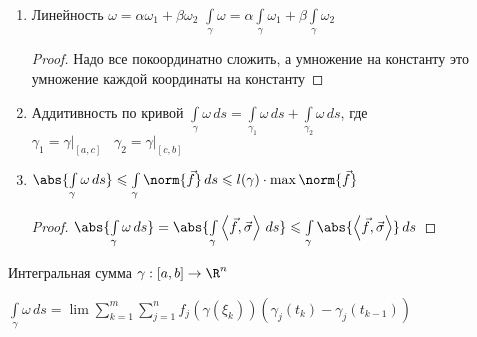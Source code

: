 \begin{properties}
\begin{enumerate}[1.]
\begin{proof}
			$\vec{\sigma}(\gamma(t)) = \frac{\gamma'(t)}{\norm{\gamma'(t)}}$ (нам нужна касательная к кривой $\Rightarrow$ это производная, а затем надо его отнормировать)
		\end{proof}
		
		\item 
		Линейность $\omega = \alpha \omega_1 + \beta \omega_2$
		$\int\limits_\gamma \omega = \alpha\int\limits_\gamma \omega_1 + \beta\int\limits_\gamma \omega_2$
		\begin{proof}
			Надо все покоординатно сложить, а умножение на константу это умножение каждой координаты на константу
		\end{proof}
		
		\item
		Аддитивность по кривой $ \int\limits_{\gamma} \omega\,ds = \int\limits_{\gamma_1} \omega\,ds + \int\limits_{\gamma_2} \omega\,ds$, где $\gamma_1 = \gamma\Big|_{[a, c]}\;\;\;\gamma_2 = \gamma\Big|_{[c, b]}$
		
		\item
		$\abs{\int\limits_{\gamma} \omega\,ds} \leqslant \int\limits_{\gamma}\norm{\vec{f}}\,ds \leqslant l(\gamma) \cdot \max\norm{\vec{f}}$
		
		\begin{proof}\thmslashn
			
			$\abs{\int\limits_{\gamma} \omega\,ds} = \abs{\int\limits_{\gamma} \left\langle \vec{f}, \vec{\sigma} \right\rangle\,ds} \leqslant  \int\limits_{\gamma} \abs{\left\langle \vec{f}, \vec{\sigma} \right\rangle}\,ds$
			
		\end{proof}
		
	\end{enumerate}
	
\end{properties}

\begin{exerc}\thmslashn
	
	Интегральная сумма $\gamma:[a, b] \to \R^n$
	
	$\int\limits_{\gamma} \omega\,ds = \lim \sum\limits_{k=1}^m\sum\limits_{j=1}^n f_j(\gamma(\xi_k))(\gamma_j(t_k) - \gamma_j(t_{k-1}))$
	
\end{exerc}